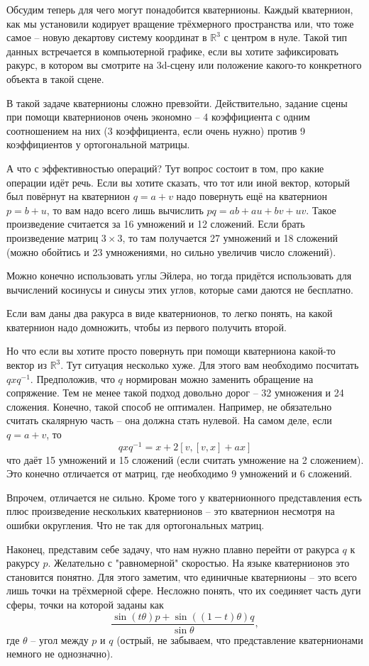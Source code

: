 \documentclass[10pt,a4paper,oneside]{book}
\theoremstyle{definition}
\newcommand{\mb}[1]{\mathbb{#1}}
\begin{document}
Обсудим теперь для чего могут понадобится кватернионы. Каждый кватернион, как мы установили кодирует вращение трёхмерного пространства или, что тоже самое -- новую декартову систему координат в $\mb R^3$ с центром в нуле. Такой тип данных встречается в компьютерной графике, если вы хотите зафиксировать ракурс, в котором вы смотрите на 3d-сцену или положение какого-то конкретного объекта в такой сцене.

В такой задаче кватернионы сложно превзойти. Действительно, задание сцены при помощи кватернионов очень экономно -- 4 коэффициента с одним соотношением на них (3 коэффициента, если очень нужно) против 9 коэффициентов у ортогональной матрицы.

А что с эффективностью операций? Тут вопрос состоит в том, про какие операции идёт речь. Если вы хотите сказать, что тот или иной вектор, который был повёрнут на кватернион $q=a+v$ надо повернуть ещё на кватернион $p=b+u$, то вам надо всего лишь вычислить $pq=ab+au+bv+uv$. Такое произведение считается за 16 умножений и 12 сложений. Если брать произведение матриц $3\times 3$, то там получается 27 умножений и 18 сложений (можно обойтись и 23 умножениями, но сильно увеличив число сложений).

Можно конечно использовать углы Эйлера, но тогда придётся использовать для вычислений косинусы и синусы этих углов, которые сами даются не бесплатно.

Если вам даны два ракурса в виде кватернионов, то легко понять, на какой кватернион надо домножить, чтобы из первого получить второй.

Но что если вы хотите просто повернуть при помощи кватерниона какой-то вектор из $\mb R^3$. Тут ситуация несколько хуже. Для этого вам необходимо посчитать $qxq^{-1}$. Предположив, что $q$ нормирован можно заменить обращение на сопряжение. Тем не менее такой подход довольно дорог -- 32 умножения и 24 сложения. Конечно, такой способ не оптимален. Например, не обязательно считать скалярную часть -- она должна стать нулевой. На самом деле, если $q=a+v$, то 
$$qxq^{-1}=x+ 2[v, [v,x]+ ax]$$
что даёт 15 умножений и 15 сложений (если считать умножение на 2 сложением). Это конечно отличается от матриц, где необходимо 9 умножений и 6 сложений.

Впрочем, отличается не сильно. Кроме того у кватернионного представления есть плюс произведение нескольких кватернионов -- это кватернион несмотря на ошибки округления. Что не так для ортогональных матриц.

Наконец, представим себе задачу, что нам нужно плавно перейти от ракурса $q$ к ракурсу $p$. Желательно с "равномерной" скоростью. На языке кватернионов это становится понятно. Для этого заметим, что единичные кватернионы -- это всего лишь точки на трёхмерной сфере. Несложно понять, что их соединяет часть дуги сферы, точки на которой заданы как 
$$ \frac{\sin(t\theta)p + \sin ((1-t)\theta) q}{\sin \theta},$$
где $\theta$ -- угол между $p$ и $q$ (острый, не забываем, что представление кватернионами немного не однозначно).
\end{document}
